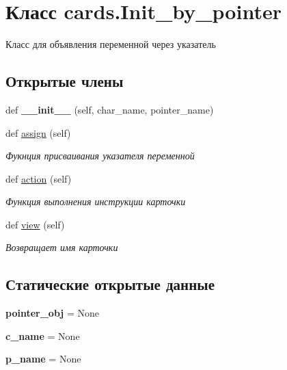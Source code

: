 \hypertarget{classcards_1_1_init__by__pointer}{}\section{Класс cards.\+Init\+\_\+by\+\_\+pointer}
\label{classcards_1_1_init__by__pointer}


Класс для объявления переменной через указатель  


\subsection*{Открытые члены}
\begin{DoxyCompactItemize}
\item 
\mbox{\label{classcards_1_1_init__by__pointer_ab8490dd880bb11aabc1d26c57a42ecba}} 
def {\bfseries \+\_\+\+\_\+init\+\_\+\+\_\+} (self, char\+\_\+name, pointer\+\_\+name)
\item 
def \mbox{\hyperlink{classcards_1_1_init__by__pointer_a38af1d596f3ed7ce273f399ff0b4a7b5}{assign}} (self)
\begin{DoxyCompactList}\small\item\em Фукнция присваивания указателя переменной \end{DoxyCompactList}\item 
def \mbox{\hyperlink{classcards_1_1_init__by__pointer_afbbc5e573c398d8798baa0911ca1544e}{action}} (self)
\begin{DoxyCompactList}\small\item\em Функция выполнения инструкции карточки \end{DoxyCompactList}\item 
def \mbox{\hyperlink{classcards_1_1_init__by__pointer_aabff065a7cad9e51f1c7c2938f750dc0}{view}} (self)
\begin{DoxyCompactList}\small\item\em Возвращает имя карточки \end{DoxyCompactList}\end{DoxyCompactItemize}
\subsection*{Статические открытые данные}
\begin{DoxyCompactItemize}
\item 
\mbox{\label{classcards_1_1_init__by__pointer_a556ce3401c1ebbfed1a21fbb7a636d3e}} 
{\bfseries pointer\+\_\+obj} = None
\item 
\mbox{\label{classcards_1_1_init__by__pointer_a818737f0ee0db4661063c06cd986478d}} 
{\bfseries c\+\_\+name} = None
\item 
\mbox{\label{classcards_1_1_init__by__pointer_a8f4712dd4dc10666344917fbe9ca5e09}} 
{\bfseries p\+\_\+name} = None
\end{DoxyCompactItemize}



